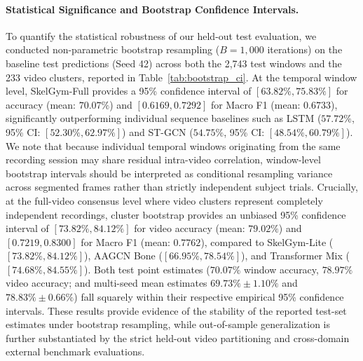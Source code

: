 \documentclass[runningheads]{llncs}
\begin{document}
\paragraph{Statistical Significance and Bootstrap Confidence Intervals.} To quantify the statistical robustness of our held-out test evaluation, we conducted non-parametric bootstrap resampling ($B=1,000$ iterations) \cite{efron1993} on the baseline test predictions (Seed 42) across both the 2,743 test windows and the 233 video clusters, reported in Table~\ref{tab:bootstrap_ci}. At the temporal window level, SkelGym-Full provides a 95\% confidence interval of $[63.82\%, 75.83\%]$ for accuracy (mean: $70.07\%$) and $[0.6169, 0.7292]$ for Macro F1 (mean: $0.6733$), significantly outperforming individual sequence baselines such as LSTM ($57.72\%$, 95\% CI: $[52.30\%, 62.97\%]$) and ST-GCN ($54.75\%$, 95\% CI: $[48.54\%, 60.79\%]$). We note that because individual temporal windows originating from the same recording session may share residual intra-video correlation, window-level bootstrap intervals should be interpreted as conditional resampling variance across segmented frames rather than strictly independent subject trials. Crucially, at the full-video consensus level where video clusters represent completely independent recordings, cluster bootstrap provides an unbiased 95\% confidence interval of $[73.82\%, 84.12\%]$ for video accuracy (mean: $79.02\%$) and $[0.7219, 0.8300]$ for Macro F1 (mean: $0.7762$), compared to SkelGym-Lite ($[73.82\%, 84.12\%]$), AAGCN Bone ($[66.95\%, 78.54\%]$), and Transformer Mix ($[74.68\%, 84.55\%]$). Both test point estimates ($70.07\%$ window accuracy, $78.97\%$ video accuracy; and multi-seed mean estimates $69.73\% \pm 1.10\%$ and $78.83\% \pm 0.66\%$) fall squarely within their respective empirical 95\% confidence intervals. These results provide evidence of the stability of the reported test-set estimates under bootstrap resampling, while out-of-sample generalization is further substantiated by the strict held-out video partitioning and cross-domain external benchmark evaluations.
\end{document}
